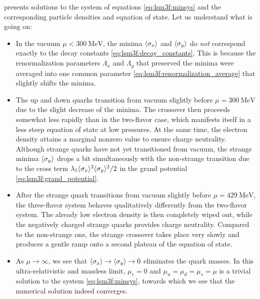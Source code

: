  presents solutions to the system of equations \eqref{eq:lsm3f:minsys} and the corresponding particle densities and equation of state.
Let us understand what is going on:
\begin{itemize}
\item In the vacuum $\mu < \SI{300}{\mega\electronvolt}$, the minima $\langle \sigma_x \rangle$ and $\langle \sigma_y \rangle$ do \emph{not} correspond exactly to the decay constants \eqref{eq:lsm3f:decay_constants}.
      This is because the renormalization parameters $\Lambda_x$ and $\Lambda_y$ that preserved the minima were averaged into one common parameter \eqref{eq:lsm3f:renormalization_average} that slightly shifts the minima.
\item The up and down quarks transition from vacuum slightly before $\mu = \SI{300}{\mega\electronvolt}$ due to the slight decrease of the minima.
      The crossover then proceeds somewhat less rapidly than in the two-flavor case, which manifests itself in a less steep equation of state at low pressures.
      At the same time, the electron density attains a marginal nonzero value to ensure charge neutrality. 
      Although strange quarks have not yet transitioned from vacuum, the strange minima $\langle \sigma_y \rangle$ drops a bit simultaneously with the non-strange transition due to the cross term $\lambda_1 \langle \sigma_x \rangle^2 \langle \sigma_y \rangle^2 / 2$ in the grand potential \eqref{eq:lsm3f:grand_potential}.
\item After the strange quark transitions from vacuum slightly before $\mu = \SI{429}{\mega\electronvolt}$, the three-flavor system behaves qualitatively differently from the two-flavor system.
      The already low electron density is then completely wiped out, while the negatively charged strange quarks provides charge neutrality.
      Compared to the non-strange one, the strange crossover takes place very slowly and produces a gentle ramp onto a second plateau of the equation of state.
\item As $\mu \rightarrow \infty$, we see that $\langle \sigma_x \rangle \rightarrow \langle \sigma_y \rangle \rightarrow 0$ eliminates the quark masses.
      In this ultra-relativistic and massless limit, $\mu_e = 0$ and $\mu_u = \mu_d = \mu_s = \mu$ is a trivial solution to the system \eqref{eq:lsm3f:minsys},
      towards which we see that the numerical solution indeed converges.
\end{itemize}

